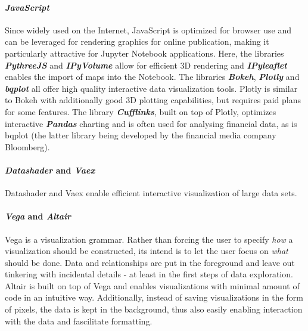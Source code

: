 \documentclass[11pt]{article}
\begin{document}
\paragraph{\texorpdfstring{\emph{JavaScript}}{JavaScript}}\label{javascript}

Since widely used on the Internet, JavaScript is optimized for browser
use and can be leveraged for rendering graphics for online publication,
making it particularly attractive for Jupyter Notebook applications.
Here, the libraries \textbf{\emph{PythreeJS}} and
\textbf{\emph{IPyVolume}} allow for efficient 3D rendering and
\textbf{\emph{IPyleaflet}} enables the import of maps into the Notebook.
The libraries \textbf{\emph{Bokeh}}, \textbf{\emph{Plotly}} and
\textbf{\emph{bqplot}} all offer high quality interactive data
visualization tools. Plotly is similar to Bokeh with additionally good
3D plotting capabilities, but requires paid plans for some features. The
library \textbf{\emph{Cufflinks}}, built on top of Plotly, optimizes
interactive \textbf{\emph{Pandas}} charting and is often used for
analysing financial data, as is bqplot (the latter library being
developed by the financial media company Bloomberg).

\paragraph{\texorpdfstring{\emph{Datashader} and
\emph{Vaex}}{Datashader and Vaex}}\label{datashader-and-vaex}

Datashader and Vaex enable efficient interactive visualization of large
data sets.

\paragraph{\texorpdfstring{\emph{Vega} and
\emph{Altair}}{Vega and Altair}}\label{vega-and-altair}

Vega is a visualization grammar. Rather than forcing the user to specify
\emph{how} a visualization should be constructed, its intend is to let
the user focus on \emph{what} should be done. Data and relationships are
put in the foreground and leave out tinkering with incidental details -
at least in the first steps of data exploration. Altair is built on top
of Vega and enables visualizations with minimal amount of code in an
intuitive way. Additionally, instead of saving visualizations in the
form of pixels, the data is kept in the background, thus also easily
enabling interaction with the data and fascilitate formatting.
\end{document}
